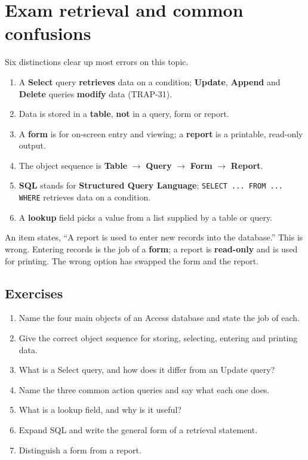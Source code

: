 \section{Exam retrieval and common confusions}
Six distinctions clear up most errors on this topic.
\begin{enumerate}
  \item A \textbf{Select} query \textbf{retrieves} data on a condition;
    \textbf{Update}, \textbf{Append} and \textbf{Delete} queries
    \textbf{modify} data (TRAP-31).
  \item Data is stored in a \textbf{table}, \textbf{not} in a query, form or
    report.
  \item A \textbf{form} is for on-screen entry and viewing; a \textbf{report}
    is a printable, read-only output.
  \item The object sequence is \textbf{Table} $\rightarrow$ \textbf{Query}
    $\rightarrow$ \textbf{Form} $\rightarrow$ \textbf{Report}.
  \item \textbf{SQL} stands for \textbf{Structured Query Language};
    \texttt{SELECT ... FROM ... WHERE} retrieves data on a condition.
  \item A \textbf{lookup} field picks a value from a list supplied by a table
    or query.
\end{enumerate}

\begin{example}
An item states, ``A report is used to enter new records into the
database.'' This is wrong. Entering records is the job of a \textbf{form}; a
report is \textbf{read-only} and is used for printing. The wrong option has
swapped the form and the report.
\end{example}

\subsection*{Exercises}
\begin{enumerate}[label=\arabic*.]
  \item Name the four main objects of an Access database and state the job of
    each.
  \item Give the correct object sequence for storing, selecting, entering and
    printing data.
  \item What is a Select query, and how does it differ from an Update query?
  \item Name the three common action queries and say what each one does.
  \item What is a lookup field, and why is it useful?
  \item Expand SQL and write the general form of a retrieval statement.
  \item Distinguish a form from a report.
\end{enumerate}

